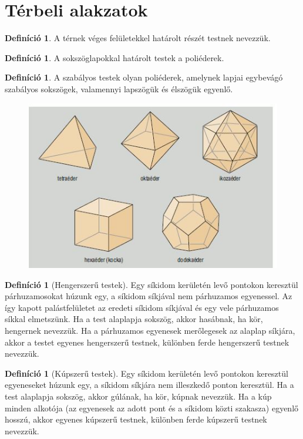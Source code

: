 \documentclass[twoside,12pt]{report}
\theoremstyle{definition}
\newtheorem{definition}[theorem]{Definíció}
\begin{document}
\section{Térbeli alakzatok}
	\begin{definition}
		A térnek véges felületekkel határolt részét testnek nevezzük.
	\end{definition}
	\begin{definition}
		A sokszöglapokkal határolt testek a poliéderek.
	\end{definition}
	\begin{definition}
		A szabályos testek olyan poliéderek, amelynek lapjai egybevágó szabályos sokszögek,
		valamennyi lapszögük és élszögük egyenlő.
	\end{definition}
	\begin{figure}[H]
		\centering
		\includegraphics[width=0.9\linewidth]{SzabPoli}
	\end{figure}
	\begin{definition}[Hengerszerű testek]
		Egy síkidom kerületén levő pontokon keresztül párhuzamosokat húzunk egy, a síkidom síkjával nem párhuzamos egyenessel. Az így kapott palástfelületet az eredeti síkidom síkjával és egy vele párhuzamos síkkal elmetszünk. Ha a test alaplapja sokszög, akkor hasábnak, ha kör, hengernek nevezzük. Ha a párhuzamos egyenesek merőlegesek az alaplap síkjára, akkor a testet egyenes hengerszerű testnek, különben ferde hengerszerű testnek nevezzük.
	\end{definition}
	\begin{definition}[Kúpszerű testek]
		Egy síkidom kerületén levő pontokon keresztül egyeneseket húzunk egy, a síkidom síkjára nem illeszkedő ponton keresztül. Ha a test alaplapja sokszög, akkor gúlának, ha kör, kúpnak nevezzük. Ha a kúp minden alkotója (az egyenesek az adott pont és a síkidom közti szakasza) egyenlő hosszú, akkor egyenes kúpszerű testnek, különben ferde kúpszerű testnek nevezzük.
	\end{definition}
\end{document}
